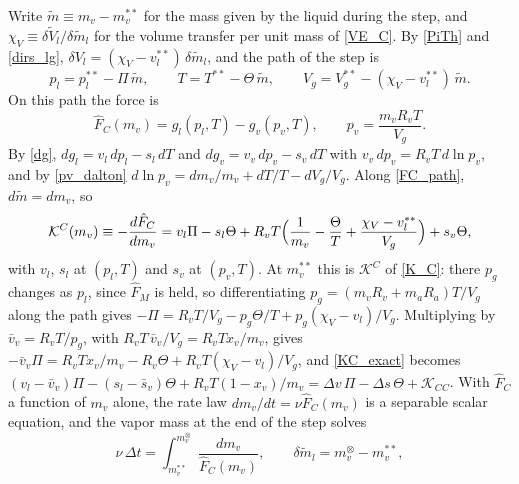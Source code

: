 Write $\tilde{m}\equiv m_v-m_v^{**}$ for the mass given by the liquid during the step, and $\chi_V\equiv\delta\tilde{V}_l/\delta\tilde{m}_l$ for the volume transfer per unit mass of \eqref{VE_C}. By \eqref{PiTh} and \eqref{dirs_lg}, $\delta V_l=(\chi_V-v_l^{**})\,\delta\tilde{m}_l$, and the path of the step is
\begin{equation}\label{FC_path}
p_l=p_l^{**}-\Pi\,\tilde{m},\qquad T=T^{**}-\Theta\,\tilde{m},\qquad V_g=V_g^{**}-(\chi_V-v_l^{**})\,\tilde{m}.
\end{equation}
On this path the force is
\begin{equation}\label{FC_exact}
\hat{F}_C(m_v)=g_l(p_l,T)-g_v(p_v,T),\qquad p_v=\frac{m_vR_vT}{V_g}.
\end{equation}
By \eqref{dg}, $dg_l=v_l\,dp_l-s_l\,dT$ and $dg_v=v_v\,dp_v-s_v\,dT$ with $v_v\,dp_v=R_vT\,d\ln p_v$, and by \eqref{pv_dalton} $d\ln p_v=dm_v/m_v+dT/T-dV_g/V_g$. Along \eqref{FC_path}, $d\tilde{m}=dm_v$, so
\begin{equation}\label{KC_exact}
\mathcal{K}^C(m_v)\equiv-\frac{d\hat{F}_C}{dm_v}=v_l\Pi-s_l\Theta+R_vT\Bigl(\frac1{m_v}-\frac{\Theta}{T}+\frac{\chi_V-v_l^{**}}{V_g}\Bigr)+s_v\Theta,
\end{equation}
with $v_l$, $s_l$ at $(p_l,T)$ and $s_v$ at $(p_v,T)$. At $m_v^{**}$ this is $\mathcal{K}^C$ of \eqref{K_C}: there $p_g$ changes as $p_l$, since $\hat{F}_M$ is held, so differentiating $p_g=(m_vR_v+m_aR_a)T/V_g$ along the path gives $-\Pi=R_vT/V_g-p_g\Theta/T+p_g(\chi_V-v_l)/V_g$. Multiplying by $\bar v_v=R_vT/p_g$, with $R_vT\,\bar v_v/V_g=R_vTx_v/m_v$, gives $-\bar v_v\Pi=R_vTx_v/m_v-R_v\Theta+R_vT(\chi_V-v_l)/V_g$, and \eqref{KC_exact} becomes $(v_l-\bar v_v)\Pi-(s_l-\bar s_v)\Theta+R_vT(1-x_v)/m_v=\Delta v\,\Pi-\Delta s\,\Theta+\mathcal{K}_{CC}$. With $\hat{F}_C$ a function of $m_v$ alone, the rate law $dm_v/dt=\nu\hat{F}_C(m_v)$ is a separable scalar equation, and the vapor mass at the end of the step solves
\begin{equation}\label{dm_dt_exact}
\nu\,\Delta t=\int_{m_v^{**}}^{m_v^{\otimes}}\frac{dm_v}{\hat{F}_C(m_v)} ,\qquad \delta\tilde{m}_l=m_v^{\otimes}-m_v^{**},
\end{equation}

